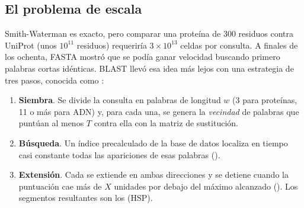 \subsection{El problema de escala}

Smith-Waterman es exacto, pero comparar una proteína de 300 residuos contra UniProt (unos $10^{11}$ residuos) requeriría $3\times10^{13}$ celdas por consulta. A finales de los ochenta, FASTA \parencite{c03-pearson1988} mostró que se podía ganar velocidad buscando primero palabras cortas idénticas. BLAST \parencite{c03-altschul1990} llevó esa idea más lejos con una estrategia de tres pasos, conocida como :

\begin{enumerate}
  \item \textbf{Siembra}. Se divide la consulta en palabras de longitud $w$ (3 para proteínas, 11 o más para ADN) y, para cada una, se genera la \emph{vecindad} de palabras que puntúan al menos $T$ contra ella con la matriz de sustitución.
  \item \textbf{Búsqueda}. Un índice precalculado de la base de datos localiza en tiempo casi constante todas las apariciones de esas palabras ().
  \item \textbf{Extensión}. Cada  se extiende en ambas direcciones y se detiene cuando la puntuación cae más de $X$ unidades por debajo del máximo alcanzado (). Los segmentos resultantes son los  (HSP).
\end{enumerate}


